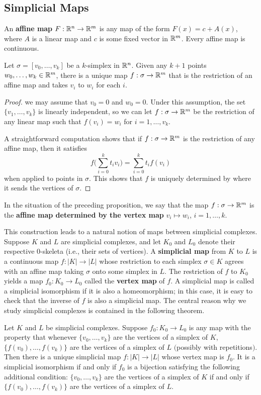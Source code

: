 \subsection{Simplicial Maps}
An \textbf{affine map} $F:\mathbb{R}^n\to\mathbb{R}^m$ is any map of the form $F(x)=c+A(x)$, where $A$ is a linear map and $c$ is some fixed vector in $\mathbb{R}^m$. Every affine map is continuous.
\begin{proposition}
Let $\sigma=[v_0,\dots,v_k]$ be a $k$-simplex in $\mathbb{R}^n$. Given any $k+1$ points
$w_0,\dots,w_k\in\mathbb{R}^m$, there is a unique map $f:\sigma\to\mathbb{R}^m$ that is the restriction of an affine map and takes $v_i$ to $w_i$ for each $i$.
\end{proposition}
\begin{proof}
we may assume that $v_0=0$ and $w_0=0$. Under this assumption, the set $\{v_1,\dots,v_k\}$ is linearly independent, so we can let $f:\sigma\to\mathbb{R}^m$ be the restriction of any linear map such that $f(v_i)=w_i$ for $i=1,\dots,v_k$.\par
A straightforward computation shows that if $f:\sigma\to\mathbb{R}^m$ is the restriction of any affine map, then it satisfies
\[f\Big(\sum_{i=0}^{k}t_iv_i\Big)=\sum_{i=0}^{k}t_if(v_i)\]
when applied to points in $\sigma$. This shows that $f$ is uniquely determined by where it sends the vertices of $\sigma$.
\end{proof}
In the situation of the preceding proposition, we say that the map $f:\sigma\to\mathbb{R}^m$ is the \textbf{affine map determined by the vertex map} $v_i\mapsto w_i$, $i=1,\dots,k$.\par
This construction leads to a natural notion of maps between simplicial complexes.
Suppose $K$ and $L$ are simplicial complexes, and let $K_0$ and $L_0$ denote their
respective $0$-skeleta (i.e., their sets of vertices). A \textbf{simplicial map} from $K$ to $L$ is a continuous map $f:|K|\to|L|$ whose restriction to each simplex $\sigma\in K$ agrees with an affine map taking $\sigma$ onto some simplex in $L$. The restriction of $f$ to $K_0$ yields a map $f_0:K_0\to L_0$ called the \textbf{vertex map} of $f$. A simplicial map is called a simplicial isomorphism if it is also a homeomorphism; in this case, it is easy to check that the inverse of $f$ is also a simplicial map. The central reason why we study simplicial complexes is contained in the following theorem.
\begin{theorem}\label{simplical map}
Let $K$ and $L$ be simplicial complexes. Suppose $f_0:K_0\to L_0$ is any map with the property that whenever $\{v_0,\dots,v_k\}$ are the vertices of a simplex of $K$, $\{f(v_0),\dots,f(v_k)\}$ are the vertices of a simplex of $L$ $($possibly with repetitions$)$. Then there is a unique simplicial map $f:|K|\to|L|$ whose vertex map is $f_0$. It is a simplicial isomorphism if and only if $f_0$ is a bijection satisfying the following additional condition: $\{v_0,\dots,v_k\}$ are the vertices of a simplex of $K$ if and only if $\{f(v_0),\dots,f(v_k)\}$ are
the vertices of a simplex of $L$.
\end{theorem}
